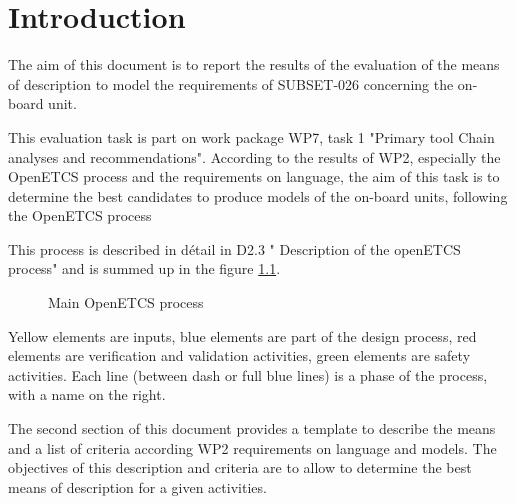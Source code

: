

\chapter{Introduction}


The aim of this document is to report the results of the evaluation of the means of description to model the requirements of SUBSET-026 concerning the on-board unit.

This evaluation task is part on work package WP7, task 1  "Primary tool Chain analyses and recommendations". According to the results of WP2, especially the OpenETCS process and the requirements on language, the aim of this task is to determine the best candidates to  produce models of the on-board units, following the OpenETCS process

This process is described in détail in D2.3 " Description of the openETCS process" and is summed up in the figure \ref{fig:main_process}.
 

 \begin{figure}
  \centering
  \caption{Main OpenETCS process}
  \label{fig:main_process}
\end{figure}

Yellow elements are inputs, blue elements are part of the design process, red elements are verification and validation activities, green elements are safety activities. Each line (between dash or full blue lines) is a phase of the process, with a name on the right. 

The second section of this document provides a template to describe the means and a list of criteria according WP2 requirements on language and models. The objectives of this description and criteria are to allow to determine the best means of description for a given activities.


